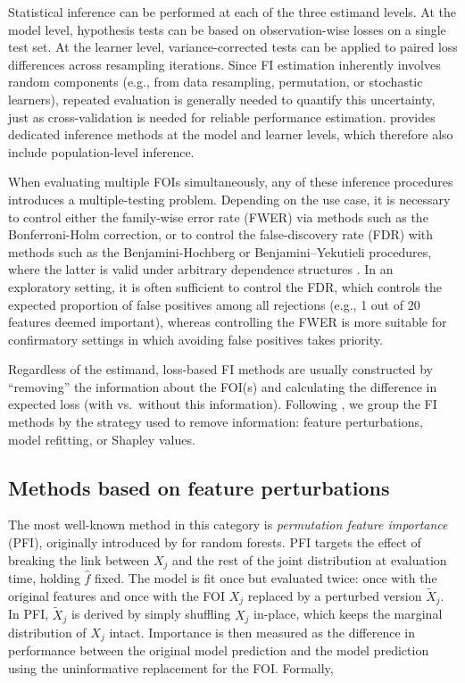 Statistical inference can be performed at each of the three estimand levels.
At the model level, hypothesis tests can be based on observation-wise losses on a single test set.
At the learner level, variance-corrected tests can be applied to paired loss differences across resampling iterations.
Since FI estimation inherently involves random components (e.g., from data resampling, permutation, or stochastic learners), repeated evaluation is generally needed to quantify this uncertainty, just as cross-validation is needed for reliable performance estimation.
 provides dedicated inference methods at the model and learner levels, which therefore also include
population-level inference.

When evaluating multiple FOIs simultaneously, any of these inference procedures introduces a multiple-testing problem.
Depending on the use case, it is necessary to control either the family-wise error rate (FWER) via methods such as the Bonferroni-Holm correction, or to control the false-discovery rate (FDR) with methods such as the Benjamini-Hochberg or Benjamini--Yekutieli procedures, where the latter is valid under arbitrary dependence structures \citep{holm1979simplesequentially, benjamini1995controllingfalsea, benjamini2001controlfalse}.
In an exploratory setting, it is often sufficient to control the FDR, which controls the expected proportion of false positives among all rejections (e.g., 1 out of 20 features deemed important), whereas controlling the FWER is more suitable for confirmatory settings in which avoiding false positives takes priority.

Regardless of the estimand, loss-based FI methods are usually constructed by ``removing'' the information about the FOI(s) and calculating the difference in expected loss (with vs.~without this information).
Following \citet{ewald2024guidefeatureb}, we group the FI methods by the strategy used to remove information: feature perturbations, model refitting, or Shapley values.

\subsection{Methods based on feature perturbations}\label{sec-fi-perturbation}

The most well-known method in this category is \emph{permutation feature importance} (PFI), originally introduced by \citet{breiman2001randomforests} for random forests.
PFI targets the effect of breaking the link between \(X_j\) and the rest of the joint distribution at evaluation time, holding \(\hat{f}\) fixed.
The model is fit once but evaluated twice: once with the original features and once with the FOI \(X_j\) replaced by a perturbed version \(\tilde{X}_j\).
In PFI, \(\tilde{X}_j\) is derived by simply shuffling \(X_j\) in-place, which keeps the marginal distribution of \(X_j\) intact.
Importance is then measured as the difference in performance between the original model prediction and the model prediction using the uninformative replacement for the FOI.
Formally,


